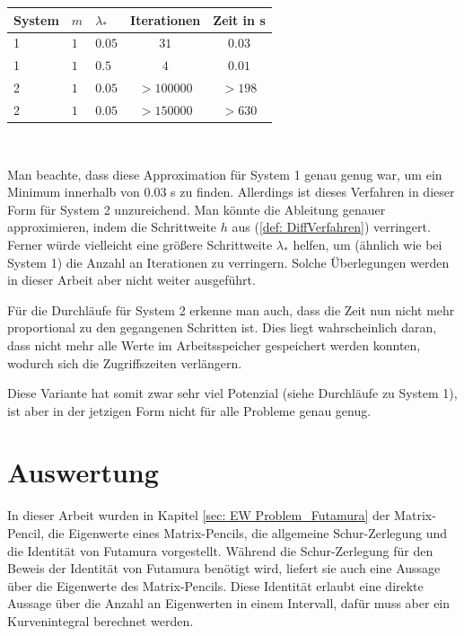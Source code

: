 \documentclass[a4paper,12pt]{report}
\newcommand{\1}{\mathds{1}}
\theoremstyle{plain} %
\theoremstyle{definition} %
\theoremstyle{remark}
\begin{document}
            \begin{table}[!ht]
                  \centering
                  \begin{tabular}{lllcc}
                       System & $m$ & $\lambda_*$ & Iterationen & Zeit in s\\
                       \hline
                       1 & $1$ & $0.05$ & $31$ & $0.03$ \\ 
                       \hline
                       1 & $1$ & $0.5$ & $4$ & $0.01$ \\
                       \hline
                       2 & $1$ & $0.05$ & $>100000$ & $>198$ \\
                       2 & $1$ & $0.05$ & $>150000$ & $>630$ \\
                       \hline
                  \end{tabular}\\
                  \label{tab: Ergebnisse_nablaJ}
            \end{table}

            Man beachte, dass diese Approximation für System 1 genau genug war, um ein Minimum innerhalb von 0.03 s zu finden.
            Allerdings ist dieses Verfahren in dieser Form für System 2 unzureichend. Man könnte die Ableitung genauer approximieren,
            indem die Schrittweite $h$ aus (\ref{def: DiffVerfahren}) verringert.
            Ferner würde vielleicht eine größere Schrittweite $\lambda_*$ helfen, um (ähnlich wie bei System 1) die Anzahl an Iterationen zu verringern.
            Solche Überlegungen werden in dieser Arbeit aber nicht weiter ausgeführt.

            Für die Durchläufe für System 2 erkenne man auch, dass die Zeit nun nicht mehr proportional zu den gegangenen Schritten ist.
            Dies liegt wahrscheinlich daran, dass nicht mehr alle Werte im Arbeitsspeicher gespeichert werden konnten, wodurch sich die Zugriffszeiten verlängern.

            Diese Variante hat somit zwar sehr viel Potenzial (siehe Durchläufe zu System 1), ist aber in der jetzigen Form nicht für alle Probleme genau genug.

\chapter{Auswertung}
\label{sec: Auswertung}

      In dieser Arbeit wurden in Kapitel \ref{sec: EW Problem_Futamura} der Matrix-Pencil, die Eigenwerte eines Matrix-Pencils,
      die allgemeine Schur-Zerlegung und die Identität von Futamura vorgestellt.
      Während die Schur-Zerlegung für den Beweis der Identität von Futamura benötigt wird, liefert sie auch eine Aussage über die Eigenwerte des Matrix-Pencils.
      Diese Identität erlaubt eine direkte Aussage über die Anzahl an Eigenwerten in einem Intervall, dafür muss aber ein Kurvenintegral berechnet werden.
\end{document}
